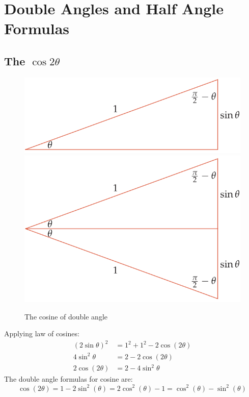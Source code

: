 \section{Double Angles and Half Angle Formulas}
\subsection{The $\cos 2\theta$}
\begin{figure}
    \centering
    \includegraphics[scale=0.3]{pics/35.png}
    \includegraphics[scale=0.3]{pics/36.png}
    \caption{The cosine of double angle}
\end{figure}
Applying law of cosines:
\begin{align}
    (2\sin \theta)^2 &= 1^2 + 1^2 - 2\cos(2\theta) \\
    4\sin^2 \theta &= 2 - 2\cos(2\theta) \\
    2\cos(2\theta) &= 2 - 4\sin^2 \theta
\end{align}
The double angle formulas for cosine are:
\[ \cos(2\theta)  = 1 - 2\sin^2(\theta) = 2\cos^2(\theta) - 1= \cos^2(\theta) - \sin^2(\theta) \]

